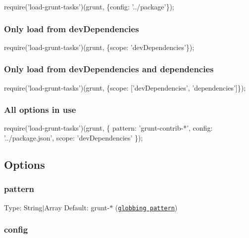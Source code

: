 \begin{DoxyCode}
require('load-grunt-tasks')(grunt, \{config: '../package'\});
\end{DoxyCode}


\subsubsection*{Only load from {\ttfamily dev\+Dependencies}}


\begin{DoxyCode}
require('load-grunt-tasks')(grunt, \{scope: 'devDependencies'\});
\end{DoxyCode}


\subsubsection*{Only load from {\ttfamily dev\+Dependencies} and {\ttfamily dependencies}}


\begin{DoxyCode}
require('load-grunt-tasks')(grunt, \{scope: ['devDependencies', 'dependencies']\});
\end{DoxyCode}


\subsubsection*{All options in use}


\begin{DoxyCode}
require('load-grunt-tasks')(grunt, \{
    pattern: 'grunt-contrib-*',
    config: '../package.json',
    scope: 'devDependencies'
\});
\end{DoxyCode}


\subsection*{Options}

\subsubsection*{pattern}

Type\+: {\ttfamily String$\vert$\+Array} Default\+: {\ttfamily \textquotesingle{}grunt-\/$\ast$\textquotesingle{}} (\href{https://github.com/isaacs/minimatch}{\tt globbing pattern})

\subsubsection*{config}

